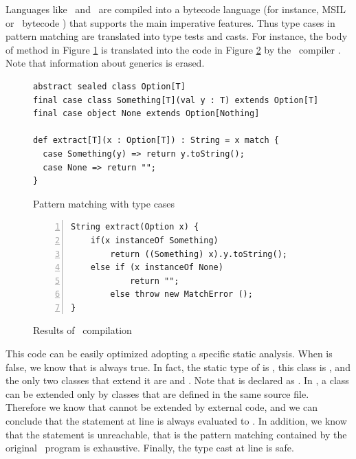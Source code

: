 \documentclass{llncs}
\begin{document}
Languages like \FSharp\ and \Scala\ are compiled into a bytecode language (for instance, MSIL \cite{ECMA06} or \Java\ bytecode \cite{JVMspecification}) that supports the main imperative features. Thus type cases in pattern matching are translated into type tests and casts. For instance, the body of method  in Figure \ref{fig:typecases} is translated into the code in Figure \ref{fig:runningexample} by the \Scala\ compiler \cite{EMO07}. Note that information about generics is erased.
\begin{figure}
\centering
\begin{lstlisting}
abstract sealed class Option[T]
final case class Something[T](val y : T) extends Option[T]
final case object None extends Option[Nothing]

def extract[T](x : Option[T]) : String = x match {
  case Something(y) => return y.toString();
  case None => return ""; 
}
\end{lstlisting}
\caption{Pattern matching with type cases}
\label{fig:typecases}
\end{figure}
\begin{figure}
\centering
\begin{lstlisting}[numbers=left, numberstyle=\tiny]
String extract(Option x) {
	if(x instanceOf Something)
		return ((Something) x).y.toString();
	else if (x instanceOf None)
			return "";
		else throw new MatchError (); 
}
\end{lstlisting}
\caption{Results of \Scala\ compilation}
\label{fig:runningexample}
\end{figure}
This code can be easily optimized adopting a specific static analysis. When  is false, we know that  is always true. In fact, the static type of  is , this class is , and the only two classes that extend it are  and . Note that  is declared as . In \Scala, a  class can be extended only by classes that are defined in the same source file. Therefore we know that  cannot be extended by external code, and we can conclude that the  statement at line  is always evaluated to . In addition, we know that the statement  is unreachable, that is the pattern matching contained by the original \Scala\ program is exhaustive. Finally, the type cast at line  is safe.
\end{document}
